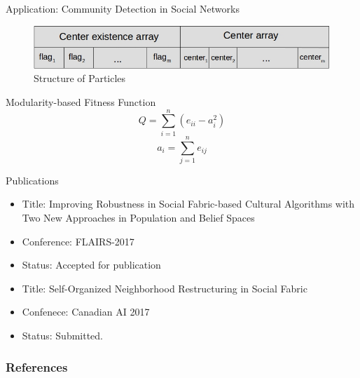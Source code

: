 \documentclass[table]{beamer}
\begin{document}
	\begin{frame}{Application: Community Detection in Social Networks}
		\begin{figure}[v]
			\includegraphics[scale=0.5]{Particle1}
			\centering
			\caption{Structure of Particles}
			\label{ref:paricle1}
		\end{figure}
		
		\begin{block}{Modularity-based Fitness Function}
			\begin{equation}
				Q=\sum_{i=1}^{n}(e_{ii}-a_{i}^{2})
			\end{equation}
			\begin{equation}
				a_{i}=\sum_{j=1}^{n}e_{ij}
			\end{equation}
		\end{block}
	\end{frame}

	\begin{frame}{Publications}
		\begin{block}{}
			\begin{itemize}
				\item Title: Improving Robustness in Social Fabric-based Cultural Algorithms with Two New Approaches in Population and Belief Spaces
				\item Conference: FLAIRS-2017
				\item Status: Accepted for publication
			\end{itemize}
		\end{block}
		
		\begin{block}{}
			\begin{itemize}
				\item Title: Self-Organized Neighborhood Restructuring in Social Fabric
				\item Confenece: Canadian AI 2017
				\item Status: Submitted.
			\end{itemize}
		\end{block}
	\end{frame}

	\begin{frame}[allowframebreaks]
		\frametitle{References}
		\fontsize{6pt}{3pt}
		
		
	\end{frame}
	
\end{document}
